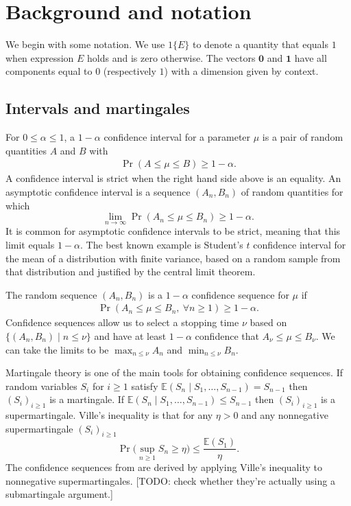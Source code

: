 \documentclass{article}
\newcommand{\art}[1]{\begingroup\color{blue}#1\endgroup}
\renewcommand{\le}{\leqslant}
\renewcommand{\ge}{\geqslant}
\newcommand{\e}{\mathbb{E}}
\newcommand{\bsone}{\boldsymbol{1}}
\newcommand{\bszero}{\boldsymbol{0}}
\newcommand{\giv}{\!\mid\!} %
\begin{document}
\section{Background and notation}\label{sec:notation}

We begin with some notation.
We use $1\{E\}$ to denote a quantity that equals $1$
when expression $E$ holds and is zero otherwise.
The vectors $\bszero$ and $\bsone$ have all components
equal to $0$ (respectively $1$) with a dimension
given by context.

\subsection{Intervals and martingales}

For $0\le\alpha\le 1$, a $1-\alpha$ confidence interval for a 
parameter $\mu$ is a pair of random quantities $A$ and $B$ with
\begin{align}\label{eq:ci}
\Pr( A\le \mu\le B)\ge 1-\alpha.
\end{align}
A confidence interval is strict when the right hand
side above is an equality.
An asymptotic confidence interval is a sequence $(A_n,B_n)$
of random quantities for which
$$
\lim_{n\to\infty}\Pr( A_n\le \mu\le B_n)\ge 1-\alpha.
$$
It is common for asymptotic confidence intervals to
be strict, meaning that this limit equals $1-\alpha$.
The best known example is Student's $t$ confidence
interval for the mean of a distribution with finite
variance, based on a random sample 
from that distribution and justified by the
central limit theorem.  %

The random sequence $(A_n,B_n)$ is a $1-\alpha$ confidence sequence
for $\mu$ if
\begin{align}\label{eq:cs}
\Pr( A_n \le \mu \le B_n,\ \forall n\ge1)\ge 1-\alpha.
\end{align}
Confidence sequences allow us to select a stopping time
$\nu$ based on $\{(A_n,B_n)\mid n\le\nu\}$ and have
at least $1-\alpha$ confidence that $A_\nu\le \mu\le B_\nu$.
We can take the limits to be $\max_{n\le \nu}A_n$
and $\min_{n\le\nu}B_n$.

Martingale theory is one of the main tools for
obtaining confidence sequences.
If random variables $S_i$ for $i\ge1$
satisfy $\e(S_n\giv S_1,\dots,S_{n-1})=S_{n-1}$
then $(S_i)_{i\ge1}$ is a martingale.
If $\e(S_n\giv S_1,\dots,S_{n-1})\le S_{n-1}$
then $(S_i)_{i\ge1}$ is a supermartingale.
Ville's inequality is that for any $\eta>0$
and any nonnegative supermartingale $(S_i)_{i\ge1}$
$$
\Pr\biggl( \sup_{n\ge1}S_n\ge \eta\biggr)\le\frac{\e(S_1)}\eta.
$$
The confidence sequences from \cite{WauRam24a} are derived
by applying Ville's inequality \cite{vill:1939} to nonnegative supermartingales.
\art{[TODO: check whether they're actually using a submartingale argument.]}
\end{document}
